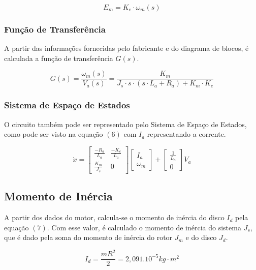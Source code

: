 \documentclass[12pt]{article}
\begin{document}
\begin{equation}
    E_m = K_e \cdot \omega_m (s)
\end{equation}

\subsubsection{Função de Transferência}
\quad A partir das informações fornecidas pelo fabricante e do diagrama de blocos, é calculada a função de transferência $G(s)$.

\begin{equation}
    G(s) = \frac{\omega_m (s)}{V_a (s)} = \frac{K_m}{J_s \cdot s \cdot (s \cdot L_a + R_a) + K_m \cdot K_e}
\end{equation}

\subsubsection{Sistema de Espaço de Estados}

\quad O circuito também pode ser representado pelo Sistema de Espaço de Estados, como pode ser visto na equação $(6)$ com $I_a$ representando a corrente.

\begin{equation}
    \dot{x} = 
    \begin{bmatrix} 
        \frac{-R_a}{L_a} & \frac{-K_e}{L_a} \\
        \frac{K_m}{J_s} & 0
    \end{bmatrix}
    \begin{bmatrix}
        I_a\\
        \omega_m
    \end{bmatrix}
    +
    \begin{bmatrix}
        \frac{1}{L_a}\\
        0
    \end{bmatrix}V_a
\end{equation}

\subsection{Momento de Inércia}

\quad A partir dos dados do motor, calcula-se o momento de inércia do disco $I_d$ pela equação $(7)$. Com esse valor, é calculado o momento de inércia do sistema $J_s$, que é dado pela soma do momento de inércia do rotor $J_m$ e do disco $J_d$.

\begin{equation}
    I_d = \frac{mR^2}{2} = 2,091.10^{-5} kg\cdot m^2
\end{equation}
\end{document}
